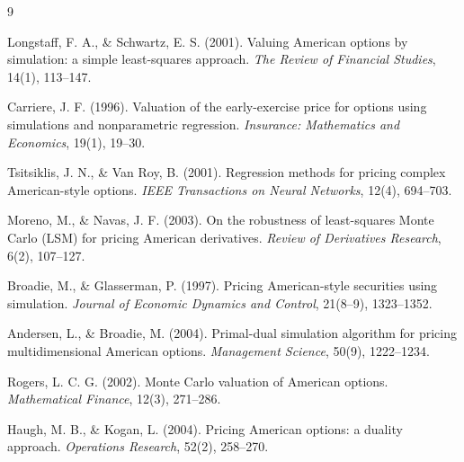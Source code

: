 \documentclass[11pt]{article}
\begin{document}
\begin{thebibliography}{9}

Longstaff, F. A., \& Schwartz, E. S. (2001).
Valuing American options by simulation: a simple least-squares approach.
\textit{The Review of Financial Studies}, 14(1), 113--147.

Carriere, J. F. (1996).
Valuation of the early-exercise price for options using simulations and nonparametric regression.
\textit{Insurance: Mathematics and Economics}, 19(1), 19--30.

Tsitsiklis, J. N., \& Van Roy, B. (2001).
Regression methods for pricing complex American-style options.
\textit{IEEE Transactions on Neural Networks}, 12(4), 694--703.

Moreno, M., \& Navas, J. F. (2003).
On the robustness of least-squares Monte Carlo (LSM) for pricing American derivatives.
\textit{Review of Derivatives Research}, 6(2), 107--127.

Broadie, M., \& Glasserman, P. (1997).
Pricing American-style securities using simulation.
\textit{Journal of Economic Dynamics and Control}, 21(8--9), 1323--1352.

Andersen, L., \& Broadie, M. (2004).
Primal-dual simulation algorithm for pricing multidimensional American options.
\textit{Management Science}, 50(9), 1222--1234.

Rogers, L. C. G. (2002).
Monte Carlo valuation of American options.
\textit{Mathematical Finance}, 12(3), 271--286.

Haugh, M. B., \& Kogan, L. (2004).
Pricing American options: a duality approach.
\textit{Operations Research}, 52(2), 258--270.

\end{thebibliography}
\end{document}
